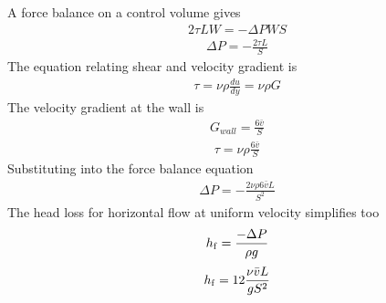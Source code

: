 \documentclass[letterpaper,10pt,english]{sphinxmanual}
\begin{document}
A force balance on a control volume gives
\begin{equation}\label{equation:Rapid_Mix/RM_Derivations:Rapid_Mix/RM_Derivations:79}
\begin{split}2 \tau L W = -\Delta P W S\end{split}
\end{equation}\begin{equation}\label{equation:Rapid_Mix/RM_Derivations:Rapid_Mix/RM_Derivations:80}
\begin{split}\Delta P = -\frac{2 \tau L}{S}\end{split}
\end{equation}
The equation relating shear and velocity gradient is
\begin{equation}\label{equation:Rapid_Mix/RM_Derivations:Rapid_Mix/RM_Derivations:81}
\begin{split}\tau = \nu \rho \frac{du}{dy} = \nu \rho G\end{split}
\end{equation}
The velocity gradient at the wall is
\begin{equation}\label{equation:Rapid_Mix/RM_Derivations:Rapid_Mix/RM_Derivations:82}
\begin{split}G_{wall} = \frac{6 \bar v}{S}\end{split}
\end{equation}\begin{equation}\label{equation:Rapid_Mix/RM_Derivations:Rapid_Mix/RM_Derivations:83}
\begin{split}\tau  = \nu \rho \frac{6 \bar v}{S}\end{split}
\end{equation}
Substituting into the force balance equation
\begin{equation}\label{equation:Rapid_Mix/RM_Derivations:Rapid_Mix/RM_Derivations:84}
\begin{split}\Delta P = -\frac{2 \nu \rho 6 \bar v L}{S^2}\end{split}
\end{equation}
The head loss for horizontal flow at uniform velocity simplifies too
\begin{equation}\label{equation:Rapid_Mix/RM_Derivations:Rapid_Mix/RM_Derivations:85}
\begin{split}h_{{\rm f}} = \frac{-\Delta P}{\rho g}\end{split}
\end{equation}\begin{equation}\label{equation:Rapid_Mix/RM_Derivations:Rapid_Mix/RM_Derivations:86}
\begin{split}h_{{\rm f}} = 12\frac{ \nu \bar v L}{gS^2}\end{split}
\end{equation}
\end{document}
